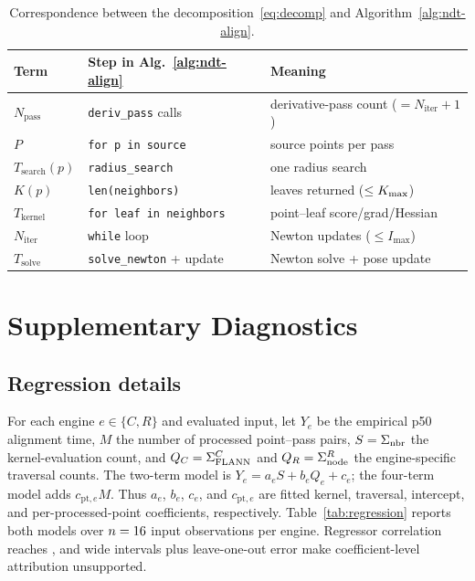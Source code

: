 \begin{table}[t]
\centering
\caption{Correspondence between the decomposition~\eqref{eq:decomp} and
Algorithm~\ref{alg:ndt-align}.}
\label{tab:eqmap}
\scriptsize
\setlength{\tabcolsep}{3pt}
\begin{tabular}{@{}lll@{}}
\toprule
Term & Step in Alg.~\ref{alg:ndt-align} & Meaning \\
\midrule
$N_{\mathrm{pass}}$ & \texttt{deriv\_pass} calls & derivative-pass count ($=N_{\mathrm{iter}}{+}1$) \\
$P$ & \texttt{for p in source} & source points per pass \\
$T_{\mathrm{search}}(p)$ & \texttt{radius\_search} & one radius search \\
$K(p)$ & \texttt{len(neighbors)} & leaves returned ($\le K_{\max}$) \\
$T_{\mathrm{kernel}}$ & \texttt{for leaf in neighbors} & point--leaf score/grad/Hessian \\
$N_{\mathrm{iter}}$ & \texttt{while} loop & Newton updates ($\le I_{\max}$) \\
$T_{\mathrm{solve}}$ & \texttt{solve\_newton} + update & Newton solve + pose update \\
\bottomrule
\end{tabular}
\end{table}

\section{Supplementary Diagnostics}

\subsection{Regression details}
\label{app:regression}
For each engine $e\in\{C,R\}$ and evaluated input, let $Y_e$ be the empirical p50
alignment time, $M$ the number of processed point--pass pairs, $S=\Sigma_{\mathrm{nbr}}$ the kernel-evaluation
count, and $Q_C=\Sigma_{\mathrm{FLANN}}^{C}$ and $Q_R=\Sigma_{\mathrm{node}}^{R}$ the engine-specific traversal counts. The
two-term model is $Y_e=a_eS+b_eQ_e+c_e$; the four-term model adds
$c_{\mathrm{pt},e}M$. Thus $a_e$, $b_e$, $c_e$, and $c_{\mathrm{pt},e}$ are fitted
kernel, traversal, intercept, and per-processed-point coefficients, respectively.
Table~\ref{tab:regression} reports both models over $n=16$ input observations per
engine. Regressor correlation reaches \regCorr, and wide intervals plus leave-one-out error
make coefficient-level attribution unsupported.


